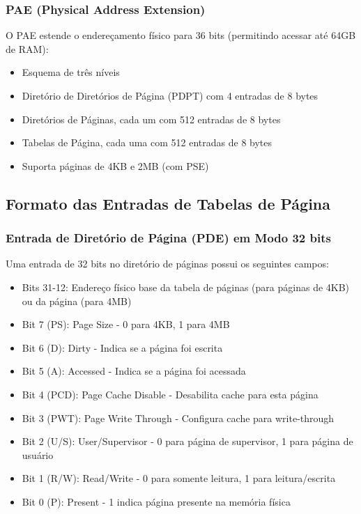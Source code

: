 \subsubsection{PAE (Physical Address Extension)}

O PAE estende o endereçamento físico para 36 bits (permitindo acessar até 64GB de RAM):
\begin{itemize}
    \item Esquema de três níveis
    \item Diretório de Diretórios de Página (PDPT) com 4 entradas de 8 bytes
    \item Diretórios de Páginas, cada um com 512 entradas de 8 bytes
    \item Tabelas de Página, cada uma com 512 entradas de 8 bytes
    \item Suporta páginas de 4KB e 2MB (com PSE)
\end{itemize}

\subsection{Formato das Entradas de Tabelas de Página}
\label{subsec:formato_entradas}

\subsubsection{Entrada de Diretório de Página (PDE) em Modo 32 bits}

Uma entrada de 32 bits no diretório de páginas possui os seguintes campos:

\begin{itemize}
    \item Bits 31-12: Endereço físico base da tabela de páginas (para páginas de 4KB) ou da página (para 4MB)
    \item Bit 7 (PS): Page Size - 0 para 4KB, 1 para 4MB
    \item Bit 6 (D): Dirty - Indica se a página foi escrita
    \item Bit 5 (A): Accessed - Indica se a página foi acessada
    \item Bit 4 (PCD): Page Cache Disable - Desabilita cache para esta página
    \item Bit 3 (PWT): Page Write Through - Configura cache para write-through
    \item Bit 2 (U/S): User/Supervisor - 0 para página de supervisor, 1 para página de usuário
    \item Bit 1 (R/W): Read/Write - 0 para somente leitura, 1 para leitura/escrita
    \item Bit 0 (P): Present - 1 indica página presente na memória física
\end{itemize}

